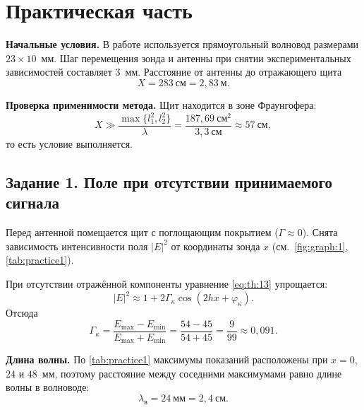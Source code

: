 \section{Практическая часть}

\noindent\textbf{Начальные условия.}
В работе используется прямоугольный волновод размерами $23 \times 10$~мм. Шаг перемещения зонда и антенны при снятии экспериментальных зависимостей составляет $3$~мм. Расстояние от антенны до отражающего щита
\begin{equation}
	X = 283~\text{см} = 2{,}83~\text{м}.
\end{equation}

\noindent\textbf{Проверка применимости метода.}
Щит находится в зоне Фраунгофера:
\begin{equation}
	X \gg \frac{\max\{l_1^2, l_2^2\}}{\lambda}
	= \frac{187{,}69~\text{см}^2}{3{,}3~\text{см}}
	\approx 57~\text{см},
\end{equation}
то есть условие выполняется.

\subsection{Задание 1. Поле при отсутствии принимаемого сигнала}

Перед антенной помещается щит с поглощающим покрытием ($\Gamma \approx 0$). Снята зависимость интенсивности поля $|E|^2$ от координаты зонда $x$ (см.~\cref{fig:graph:1}, \cref{tab:practice1}).

При отсутствии отражённой компоненты уравнение \cref{eq:th:13} упрощается:
\begin{equation}
	|E|^2 \approx 1 + 2\Gamma_\kappa \cos(2hx + \varphi_\kappa).
	\label{eq:pr:1.1}
\end{equation}
Отсюда
\begin{equation}
	\Gamma_\kappa
	= \frac{E_{\max} - E_{\min}}{E_{\max} + E_{\min}}
	= \frac{54 - 45}{54 + 45}
	= \frac{9}{99}
	\approx 0{,}091.
	\label{eq:pr:1.2}
\end{equation}



\noindent\textbf{Длина волны.}
По \cref{tab:practice1} максимумы показаний расположены при $x = 0$, $24$ и $48$~мм, поэтому расстояние между соседними максимумами равно длине волны в волноводе:
\begin{equation}
	\lambda_{\text{в}} = 24~\text{мм} = 2{,}4~\text{см}.
\end{equation}

